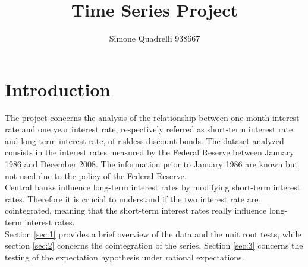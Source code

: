 \documentclass[12pt]{article}
\title{Time Series Project}
\author{Simone Quadrelli 938667}
\begin{document}
\maketitle
\newpage
\tableofcontents
{}
\newpage
\section{Introduction}
The project concerns the analysis of the relationship between one month interest rate and one year interest rate, respectively referred as short-term interest rate and long-term interest rate, of riskless discount bonds. The dataset analyzed consists in the interest rates measured by the Federal Reserve between January 1986 and December 2008. The information prior to January 1986 are known but not used due to the policy of the Federal Reserve.
\\Central banks influence long-term interest rates by modifying  short-term interest rates. Therefore it is crucial to understand if the two interest rate are cointegrated, meaning that the short-term interest rates really influence long-term interest rates.
\\Section \ref{sec:1} provides a brief overview of the data and the unit root tests, while section \ref{sec:2} concerns the cointegration of the series. Section \ref{sec:3} concerns the testing of the expectation hypothesis under rational expectations.
\end{document}

